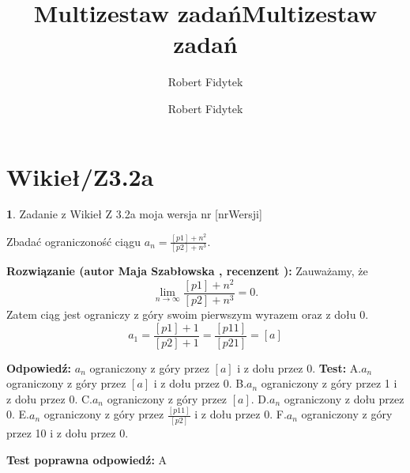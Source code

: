 \documentclass[12pt, a4paper]{article}
\title{Multizestaw zadań}
\author{Robert Fidytek}
\date{}\documentclass[12pt, a4paper]{article}
\title{Multizestaw zadań}
\author{Robert Fidytek}
\date{}
\theoremstyle{definition} %
\newtheorem{zad}{}
\theoremstyle{definition} %
\newtheorem{zad}{}
\newcommand{\kategoria}[1]{\section{#1}} %
\newcommand{\zadStart}[1]{\begin{zad}#1\newline} %
\newcommand{\zadStop}{\end{zad}}   %
\newcommand{\rozwStart}[2]{\noindent \textbf{Rozwiązanie (autor #1 , recenzent #2): }\newline} %
\newcommand{\rozwStop}{\newline}                                            %
\newcommand{\odpStart}{\noindent \textbf{Odpowiedź:}\newline}    %
\newcommand{\odpStop}{\newline}                                             %
\newcommand{\testStart}{\noindent \textbf{Test:}\newline} %
\newcommand{\testStop}{\newline} %
\newcommand{\kluczStart}{\noindent \textbf{Test poprawna odpowiedź:}\newline} %
\newcommand{\kluczStop}{\newline} %
\begin{document}
\maketitle


\kategoria{Wikieł/Z3.2a}
\zadStart{Zadanie z Wikieł Z 3.2a moja wersja nr [nrWersji]}


Zbadać ograniczoność ciągu $a_{n}=\frac{[p1]+n^{2}}{[p2]+n^{3}}$.

\zadStop

\rozwStart{Maja Szabłowska}{}
Zauważamy, że
$$\lim_{n\to\infty}\frac{[p1]+n^{2}}{[p2]+n^{3}}=0.$$
Zatem ciąg jest ograniczy z góry swoim pierwszym wyrazem oraz z dołu 0.
$$a_{1}=\frac{[p1]+1}{[p2]+1}=\frac{[p11]}{[p21]}=[a]$$

\rozwStop


\odpStart
$a_{n}$ ograniczony z góry przez $[a]$ i z dołu przez 0.
\odpStop
\testStart
A.$a_{n}$ ograniczony z góry przez $[a]$ i z dołu przez 0.
B.$a_{n}$ ograniczony z góry przez 1 i z dołu przez 0.
C.$a_{n}$ ograniczony z góry przez $[a]$.
D.$a_{n}$ ograniczony z dołu przez 0.
E.$a_{n}$ ograniczony z góry przez $\frac{[p11]}{[p2]}$ i z dołu przez 0.
F.$a_{n}$ ograniczony z góry przez 10 i z dołu przez 0.


\testStop
\kluczStart
A
\kluczStop
\end{document}
